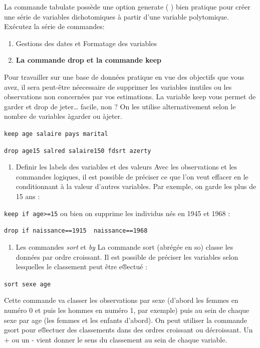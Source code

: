 \documentclass[
]{book}
\providecommand{\tightlist}{%
  \setlength{\itemsep}{0pt}\setlength{\parskip}{0pt}}
\begin{document}
La commande tabulate possède une option generate ( ) bien
pratique pour créer une série de variables dichotomiques à partir
d'une variable polytomique. Exécutez la série de commandes:

\begin{enumerate}
\def\labelenumi{(\arabic{enumi})}
\setcounter{enumi}{3}
\item
  Gestions des dates et Formatage des variables
\item
  \textbf{La commande drop et la commande keep}
\end{enumerate}

Pour travailler sur une base de données pratique en vue des objectifs que vous avez, il sera peut-être néecessaire de supprimer les variables inutiles ou les observations non concernées par vos estimations. La variable keep vous permet de garder et drop de jeter\ldots{} facile, non ? On les utilise alternativement selon le nombre de variables àgarder ou àjeter.

\texttt{keep\ age\ salaire\ pays\ marital}

\texttt{drop\ age15\ salred\ salaire150\ fdsrt\ azerty}

\begin{enumerate}
\def\labelenumi{(\arabic{enumi})}
\setcounter{enumi}{5}
\tightlist
\item
  Definir les labels des variables et des valeurs
  Avec les observations et les commandes logiques, il est possible de préciser ce que l'on veut effacer en le conditionnant à la valeur d'autres variables. Par exemple, on garde les plus de 15 ans :
\end{enumerate}

\texttt{keep\ if\ age\textgreater{}=15}
ou bien on supprime les individus nés en 1945 et 1968 :

\texttt{drop\ if\ naissance==1915\ \textbar{}\ naissance==1968}

\begin{enumerate}
\def\labelenumi{(\arabic{enumi})}
\setcounter{enumi}{4}
\tightlist
\item
  Les commandes \emph{sort} et \emph{by}
  La commande sort (abrégée en so) classe les données par ordre croissant. Il est possible de
  préciser les variables selon lesquelles le classement peut être e®ectué :
\end{enumerate}

\texttt{sort\ sexe\ age}

Cette commande va classer les observations par sexe (d'abord les femmes en numéro 0 et puis
les hommes en numéro 1, par exemple) puis au sein de chaque sexe par age (les femmes et les
enfants d'abord). On peut utiliser la commande gsort pour e®ectuer des classements dans des
ordres croissant ou décroissant. Un + ou un - vient donner le sens du classement au sein de chaque
variable.
\end{document}
